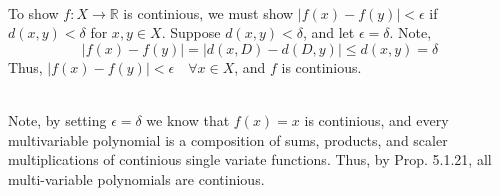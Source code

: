\documentclass[letterpaper,12pt]{article}
\theoremstyle{definition}
\begin{document}
\\
To show $f:X \rightarrow \mathbb{R}$ is continious, we must show 
$|f(x)-f(y)| < \epsilon$ if $d(x,y) < \delta$ for $x,y \in X$.
Suppose $d(x,y) < \delta$, and let $\epsilon = \delta$. Note, 
\[|f(x) - f(y)| = |d(x,D) - d(D,y) | \leq d(x,y) = \delta\]
Thus, $ |f(x) - f(y)| < \epsilon \quad \forall x \in X$, and $f$ is continious.

\\
Note, by setting $\epsilon = \delta$ we know that $f(x) = x$ is continious, and every multivariable polynomial is a composition of sums, products, and scaler
multiplications of continious single variate functions. Thus, by Prop. 5.1.21, all multi-variable polynomials are continious.
\end{document}
